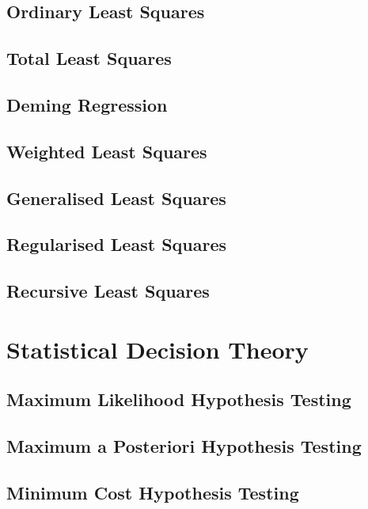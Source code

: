 \documentclass[11pt]{report} %
\begin{document}
\subsection{Ordinary Least Squares}

\subsection{Total Least Squares}

\subsection{Deming Regression}

\subsection{Weighted Least Squares}

\subsection{Generalised Least Squares}

\subsection{Regularised Least Squares}

\subsection{Recursive Least Squares}

\section{Statistical Decision Theory}

\subsection{Maximum Likelihood Hypothesis Testing}

\subsection{Maximum a Posteriori Hypothesis Testing}

\subsection{Minimum Cost Hypothesis Testing}
\end{document}
